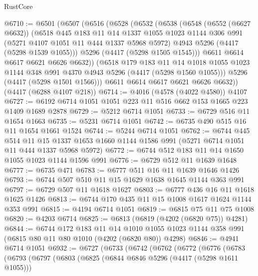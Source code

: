 \begin{lexlean}{RustCore}
\begin{coremodule}
@6710 := @6501
    (@6507
      (@6516
        (@6528
          (@6532
            (@6538
              (@6548
                (@6552 (@6627 @6632))
                (@6518
                  @445
                  @183
                  @11
                  @14
                  @1337
                  @1055
                  @1023
                  @1144
                  @306
                  @991
                  (@5271 @4107 @1051 @11 @444 @1337 @5968 @5972)
                  @4943
                  @5296
                  (@4417 (@5298 @1539 @1055)))
                @5296
                (@4417 (@5298 @1505 @1545)))
              @6611
              @6614
              @6617
              @6621
              @6626
              @6632))
          (@6518
            @179
            @183
            @11
            @14
            @1018
            @1055
            @1023
            @1144
            @348
            @991
            @4370
            @4943
            @5296
            (@4417 (@5298 @1560 @1055)))
          @5296
          (@4417 (@5298 @1501 @1566)))
        @6611
        @6614
        @6617
        @6621
        @6626
        @6632))
    (@4417 (@6288 @4107 @218))
@6714 := @4016 (@4578 (@4022 @4580)) @4107
@6727 := @6192 @6714 @1051 @1051 @223 @11 @516 @662 @153 @1665 @223 @1409 @1689 @2878
@6729 := @5212 @6714 @1051
@6733 := @6729 @516 @11 @1654 @1663
@6735 := @5231 @6714 @1051
@6742 := @6735 @490 @515 @16 @11 @1654 @1661 @1524
@6744 := @5244 @6714 @1051
@6762 := @6744
    @445
    @514
    @11
    @15
    @1337
    @1653
    @1660
    @1144
    @1586
    @991
    (@5271 @6714 @1051 @11 @444 @1337 @5968 @5972)
@6772 := @6744 @512 @183 @11 @14 @1650 @1055 @1023 @1144 @1596 @991
@6776 := @6729 @512 @11 @1639 @1648
@6777 := @6735 @471
@6783 := @6777 @511 @16 @11 @1639 @1646 @1426
@6793 := @6744 @507 @510 @11 @15 @1629 @1638 @1645 @1144 @363 @991
@6797 := @6729 @507 @11 @1618 @1627
@6803 := @6777 @436 @16 @11 @1618 @1625 @1426
@6813 := @6744 @170 @435 @11 @15 @1008 @1617 @1624 @1144 @353 @991
@6815 := @4194 @6714 @1051
@6819 := @6815 @75 @11 @75 @1008
@6820 := @4203 @6714
@6825 := @6813 (@6819 (@4202 (@6820 @75)) @4281)
@6844 := @6744
    @172
    @183
    @11
    @14
    @1010
    @1055
    @1023
    @1144
    @358
    @991
    (@6815 @80 @11 @80 @1010 (@4202 (@6820 @80)) @4298)
@6846 := @4941 @6714 @1051
@6932 := @6727
    (@6733
      (@6742
        (@6762
          (@6772
            (@6776
              (@6783
                (@6793
                  (@6797
                    (@6803
                      (@6825
                        (@6844 @6846 @5296 (@4417 (@5298 @1611 @1055)))

\end{coremodule}
\end{lexlean}
